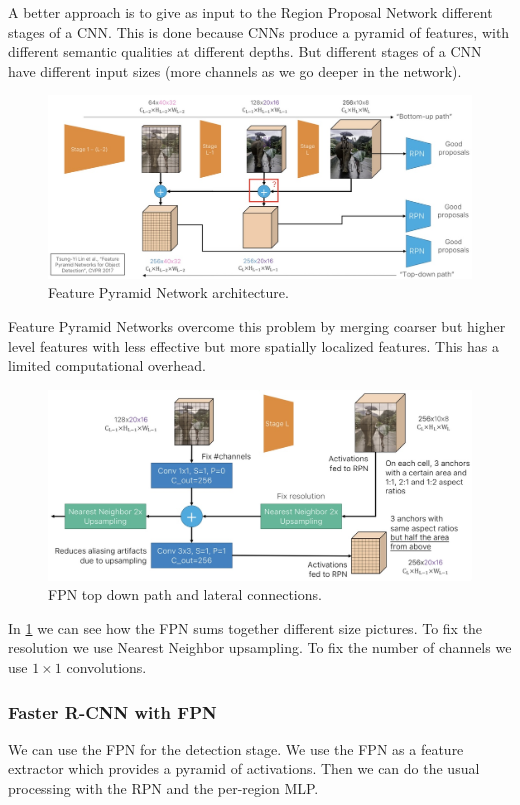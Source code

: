 A better approach is to give as input to the Region Proposal Network different stages of a CNN.
This is done because CNNs produce a pyramid of features, with different semantic qualities at different depths.
But different stages of a CNN have different input sizes (more channels as we go deeper in the network).

\begin{figure}[htbp]
  \centering
  \includegraphics[width=0.7\linewidth]{./img/fpn.jpg}
  \caption{Feature Pyramid Network architecture.}
\end{figure}

Feature Pyramid Networks overcome this problem by merging coarser but higher level features with less effective but more spatially localized features.
This has a limited computational overhead.

\begin{figure}[htbp]
  \centering
  \includegraphics[width=0.7\linewidth]{./img/fpnsum.jpg}
  \caption{FPN top down path and lateral connections.}
  \label{fig:fpnsum}
\end{figure}

In \ref{fig:fpnsum} we can see how the FPN sums together different size pictures.
To fix the resolution we use Nearest Neighbor upsampling.
To fix the number of channels we use $1\times 1$ convolutions.

\subsubsection{Faster R-CNN with FPN}
We can use the FPN for the detection stage.
We use the FPN as a feature extractor which provides a pyramid of activations.
Then we can do the usual processing with the RPN and the per-region MLP.

